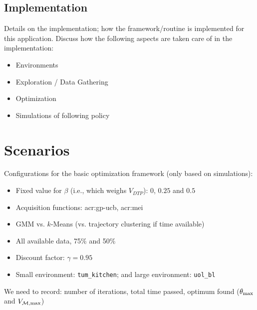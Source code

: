 \subsection{Implementation}
\label{sec:implementation}

Details on the implementation; how the framework/routine is implemented for this application. Discuss how the following aspects are taken care of in the implementation:
\begin{itemize}
	\item Environments
	\item Exploration / Data Gathering
	\item Optimization
	\item Simulations of following policy
\end{itemize}

\section{Scenarios}
\label{sec:scenarios}


\noindent Configurations for the basic optimization framework (only based on simulations):
\begin{itemize}
	\item Fixed value for $\beta$ (i.e., which weighs $V_\mathit{DTP}$): $0$, $0.25$ and $0.5$
	\item Acquisition functions: \acrshort{acr:gp-ucb}, \acrshort{acr:mei}
	\item GMM vs. $k$-Means (vs. trajectory clustering if time available)
	\item All available data, 75\% and 50\%
	\item Discount factor: $\gamma = 0.95$
	\item Small environment: \texttt{tum\_kitchen}; and large environment: \texttt{uol\_bl}
\end{itemize}
We need to record: number of iterations, total time passed, optimum found ($\theta_\textnormal{max}$ and $V_{\mathcal{M},\textnormal{max}}$)


